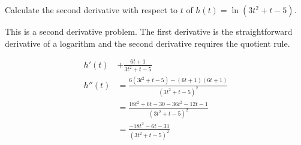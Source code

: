 \documentclass{ximera}
\author{Emma Smith Zbarsky}
\begin{document}
\begin{exercise}

Calculate the second derivative with respect to $t$ of
$h(t) = \ln(3t^2+t-5)$.


\begin{hint}
This is a second derivative problem. The first derivative is the
straightforward derivative of a logarithm and the second derivative
requires the quotient rule.
\end{hint}


\begin{hint}
\begin{align*}
h'(t) &+ \frac{6t+1}{3t^2+t-5} \\
h''(t) &= \frac{6(3t^2+t-5)-(6t+1)(6t+1)}{(3t^2+t-5)^2} \\
&= \frac{18t^2+6t-30-36t^2-12t-1}{(3t^2+t-5)^2} \\
&= \frac{-18t^2-6t-31}{(3t^2+t-5)^2} 
\end{align*}
\end{hint}


\begin{multipleChoice}
\end{multipleChoice}

\end{exercise}
\end{document}
